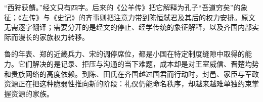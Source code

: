 \begin{textwindow}[《春秋》的最后一笔]
“西狩获麟。”经文只有四字。后来的《公羊传》把它解释为孔子“吾道穷矣”的象征；《左传》与《史记》的齐事则把注意力带到陈恒弑君及其后的权力安排。原文无需逐字翻译；需要分开的是经文的停止、经学传统的象征解释，以及齐国内部实际而漫长的家族权力转移。
\end{textwindow}

\begin{turningpoint}
鲁的年表、郑的近畿兵力、宋的调停席位，都是小国在特定制度缝隙中取得的能力。它们解决的是记录、拒压与沟通的当下难题，成本却是对王室威信、晋楚均势和贵族网络的高度依赖。到陈、田氏在齐国越过国君而行动时，封邑、家臣与军政资源正在把这种脆弱性推向新的阶段：礼仪仍能命名秩序，却越来越难单独约束掌握资源的家族。
\end{turningpoint}
